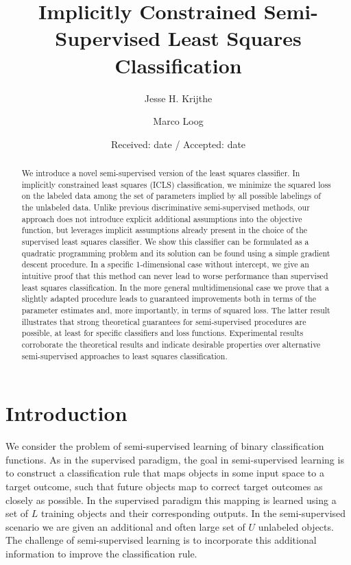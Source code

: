 \documentclass{llncs}
\newcommand{\Nunl}{U}
\newcommand{\Nlab}{L}
\begin{document}
\title{Implicitly Constrained Semi-Supervised Least Squares Classification}
\subtitle{}
\author{Jesse H. Krijthe \and Marco Loog}


\date{Received: date / Accepted: date}

\maketitle


\begin{abstract}
We introduce a novel semi-supervised version of the least squares classifier. In implicitly constrained least squares (ICLS) classification, we minimize the squared loss on the labeled data among the set of parameters implied by all possible labelings of the unlabeled data. Unlike previous discriminative semi-supervised methods, our approach does not introduce explicit additional assumptions into the objective function, but leverages implicit assumptions already present in the choice of the supervised least squares classifier.  We show this classifier can be formulated as a quadratic programming problem and its solution can be found using a simple gradient descent procedure. In a specific 1-dimensional case without intercept, we give an intuitive proof that this method can never lead to worse performance than supervised least squares classification. In the more general multidimensional case we prove that a slightly adapted procedure leads to guaranteed improvements both in terms of the parameter estimates and, more importantly, in terms of squared loss. The latter result illustrates that strong theoretical guarantees for semi-supervised procedures are possible, at least for specific classifiers and loss functions. Experimental results corroborate the theoretical results and indicate desirable properties over alternative semi-supervised approaches to least squares classification. 

\end{abstract}

\section{Introduction}
We consider the problem of semi-supervised learning of binary classification functions. As in the supervised paradigm, the goal in semi-supervised learning is to construct a classification rule that maps objects in some input space to a target outcome, such that future objects map to correct target outcomes as closely as possible. In the supervised paradigm this mapping is learned using a set of $\Nlab$ training objects and their corresponding outputs. In the semi-supervised scenario we are given an additional and often large set of $\Nunl$ unlabeled objects. The challenge of semi-supervised learning is to incorporate this additional information to improve the classification rule.
\end{document}
